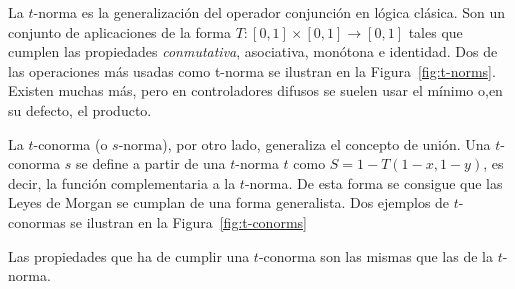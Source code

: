 \begin{figure*}
	\centering
	\caption[$t$-normas del mínimo y del producto algebraico.]{Las $t$-normas de mínimo y de producto algebraico son dos representantes de un conjunto muy amplio de funciones.}
	\label{fig:t-norms}
\end{figure*}

La $t$-norma es la generalización del operador conjunción en lógica clásica. Son un conjunto de aplicaciones de la forma $T: [0, 1] \times [0, 1] \rightarrow [0, 1]$ tales que cumplen las propiedades \textit{conmutativa}, asociativa, monótona e identidad. Dos de las operaciones más usadas como t-norma se ilustran en la Figura~\ref{fig:t-norms}. Existen muchas más, pero en controladores difusos se suelen usar el mínimo o,en su defecto, el producto.

La $t$-conorma (o $s$-norma), por otro lado, generaliza el concepto de unión. Una $t$-conorma $s$ se define a partir de una $t$-norma $t$ como $S = 1 - T(1-x, 1-y)$, es decir, la función complementaria a la $t$-norma. De esta forma se consigue que las Leyes de Morgan se cumplan de una forma generalista. Dos ejemplos de $t$-conormas se ilustran en la Figura~\ref{fig:t-conorms}

Las propiedades que ha de cumplir una $t$-conorma son las mismas que las de la $t$-norma.

\begin{figure*}
	\centering
	\caption[$t$-normas del máximo y de la suma algebraica.]{Las $t$-conormas de máximo y de suma algebraica son las complementarias a $t$-normas mostradas previamente, y como ocurre en estas, existen tantas $t$-conormas como $t$-normas definidas.}
	\label{fig:t-conorms}
\end{figure*}

